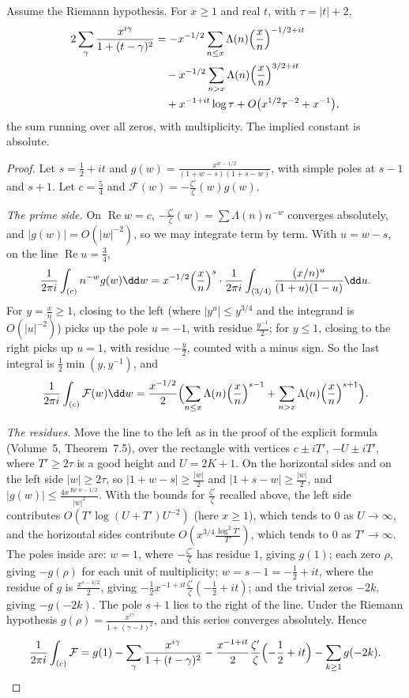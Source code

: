 \begin{lemma}\label{lem:montexplicit}
Assume the Riemann hypothesis. For $x\ge1$ and real $t$, with $\tau=|t|+2$,
\[
\begin{aligned}2\sum_\gamma\frac{x^{i\gamma}}{1+(t-\gamma)^2}&=-x^{-1/2}\sum_{n\le x}\Lambda(n)\Bigl(\frac xn\Bigr)^{-1/2+it}\\&\quad-x^{-1/2}\sum_{n>x}\Lambda(n)\Bigl(\frac xn\Bigr)^{3/2+it}\\&\quad+x^{-1+it}\log\tau+O\bigl(x^{1/2}\tau^{-2}+x^{-1}\bigr),\end{aligned}
\]
the sum running over all zeros, with multiplicity. The implied constant is absolute.
\end{lemma}
\begin{proof}
Let $s=\frac12+it$ and $g(w)=\frac{x^{w-1/2}}{(1+w-s)(1+s-w)}$, with simple poles at $s-1$ and $s+1$. Let $c=\frac54$ and $\mathcal F(w)=-\frac{\zeta'}\zeta(w)g(w)$.

\emph{The prime side.} On $\operatorname{Re}w=c$, $-\frac{\zeta'}\zeta(w)=\sum\Lambda(n)n^{-w}$ converges absolutely, and $|g(w)|=O(|w|^{-2})$, so we may integrate term by term. With $u=w-s$, on the line $\operatorname{Re}u=\frac34$,
\[
\frac1{2\pi i}\int_{(c)}n^{-w}g(w)\dd w=x^{-1/2}\Bigl(\frac xn\Bigr)^s\cdot\frac1{2\pi i}\int_{(3/4)}\frac{(x/n)^u}{(1+u)(1-u)}\dd u.
\]
For $y=\frac xn\ge1$, closing to the left (where $|y^u|\le y^{3/4}$ and the integrand is $O(|u|^{-2})$) picks up the pole $u=-1$, with residue $\frac{y^{-1}}2$; for $y\le1$, closing to the right picks up $u=1$, with residue $-\frac y2$, counted with a minus sign. So the last integral is $\frac12\min(y,y^{-1})$, and
\[
\frac1{2\pi i}\int_{(c)}\mathcal F(w)\dd w=\frac{x^{-1/2}}2\Bigl(\sum_{n\le x}\Lambda(n)\Bigl(\frac xn\Bigr)^{s-1}+\sum_{n>x}\Lambda(n)\Bigl(\frac xn\Bigr)^{s+1}\Bigr).
\]

\emph{The residues.} Move the line to the left as in the proof of the explicit formula (Volume~5, Theorem~7.5), over the rectangle with vertices $c\pm iT'$, $-U\pm iT'$, where $T'\ge2\tau$ is a good height and $U=2K+1$. On the horizontal sides and on the left side $|w|\ge2\tau$, so $|1+w-s|\ge\frac{|w|}2$ and $|1+s-w|\ge\frac{|w|}2$, and $|g(w)|\le\frac{4x^{\operatorname{Re}w-1/2}}{|w|^2}$. With the bounds for $\frac{\zeta'}\zeta$ recalled above, the left side contributes $O(T'\log(U+T')U^{-2})$ (here $x\ge1$), which tends to $0$ as $U\to\infty$, and the horizontal sides contribute $O(x^{3/4}\frac{\log^2T'}{T'})$, which tends to $0$ as $T'\to\infty$. The poles inside are: $w=1$, where $-\frac{\zeta'}\zeta$ has residue $1$, giving $g(1)$; each zero $\rho$, giving $-g(\rho)$ for each unit of multiplicity; $w=s-1=-\frac12+it$, where the residue of $g$ is $\frac{x^{s-3/2}}2$, giving $-\frac12x^{-1+it}\frac{\zeta'}\zeta(-\frac12+it)$; and the trivial zeros $-2k$, giving $-g(-2k)$. The pole $s+1$ lies to the right of the line. Under the Riemann hypothesis $g(\rho)=\frac{x^{i\gamma}}{1+(\gamma-t)^2}$, and this series converges absolutely. Hence
\[
\frac1{2\pi i}\int_{(c)}\mathcal F=g(1)-\sum_\gamma\frac{x^{i\gamma}}{1+(t-\gamma)^2}-\frac{x^{-1+it}}2\frac{\zeta'}\zeta\Bigl(-\frac12+it\Bigr)-\sum_{k\ge1}g(-2k).
\]


\end{proof}
